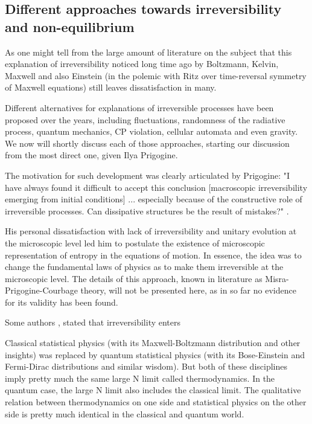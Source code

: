 \documentclass[a4paper,12pt]{article}
\begin{document}
\subsection{Different approaches towards irreversibility and non-equilibrium}

As one might tell from the large amount of literature on the subject \cite{Doyle:wf} \cite{Layzer:1970dx} \cite{Wolfram:552851} \cite{Rovelli:2015tv} \cite{Courbage:1983eo} %
 that this explanation of irreversibility noticed long time ago by Boltzmann, Kelvin, Maxwell \cite{Wolfram:552851} and also Einstein (in the polemic with Ritz over time-reversal symmetry of Maxwell equations) still leaves dissatisfaction in many.

Different alternatives for explanations of irreversible processes have been proposed over the years, including fluctuations, randomness of the radiative process, quantum mechanics, CP violation, cellular automata and even gravity. We now will shortly discuss each of those approaches, starting our discussion from the most direct one, given Ilya Prigogine.

The motivation for such development was clearly articulated by Prigogine:
"I have always found it difficult to accept this conclusion [macroscopic irreversibility emerging from initial conditions] {...} especially because of the constructive role of irreversible processes. Can dissipative structures be the result of mistakes?" \cite{Prigogine:1978kz}.

His personal dissatisfaction with lack of irreversibility and unitary evolution at the microscopic level led him to postulate the existence of microscopic representation of entropy in the equations of motion. 
In essence, the idea was to change the fundamental laws of physics as to make them irreversible at the microscopic level. The details of this approach, known in literature as Misra-Prigogine-Courbage theory\cite{Courbage:1983eo}, will not be presented here, as in so far no evidence for its validity has been found\cite{Bricmont:7zJsfTpK}.

Some authors \cite{Doyle:wf}, stated that irreversibility enters

Classical statistical physics (with its Maxwell-Boltzmann distribution and other insights) was replaced by quantum statistical physics (with its Bose-Einstein and Fermi-Dirac distributions and similar wisdom). But both of these disciplines imply pretty much the same large N limit called thermodynamics. In the quantum case, the large N limit also includes the classical limit. The qualitative relation between thermodynamics on one side and statistical physics on the other side is pretty much identical in the classical and quantum world.
\end{document}
